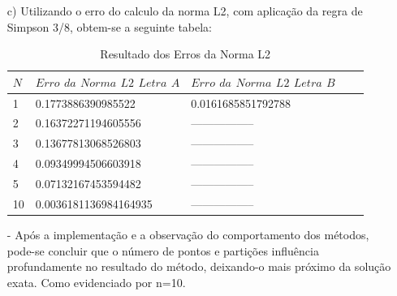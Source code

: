 \documentclass{article}
\begin{document}
\begin{itemize}
\begin{itemize}
\item[c)] Utilizando o erro do calculo da norma L2, com aplicação da regra de Simpson 3/8, obtem-se a seguinte tabela:

\begin{table}[h]
\centering
  \begin{tabular}{|l|l|l|ll}
   $N$ & $Erro$ $da$ $Norma$ $L2$ $Letra$ $A$ & $Erro$ $da$ $Norma$ $L2$ $Letra$ $B$ \\
    \hline
    1 &   0.1773886390985522 & 0.0161685851792788 \\
    2 &   0.16372271194605556 & ----------------- \\
    3 &   0.13677813068526803 & ----------------- \\
    4 &   0.09349994506603918 & ----------------- \\
    5 &   0.07132167453594482 & ----------------- \\
    10 &    0.0036181136984164935 & ----------------- \\
    \hline
  \end{tabular}
  \caption{Resultado dos Erros da Norma L2}
\end{table}

\item[-] Após a implementação e a observação do comportamento dos métodos, pode-se concluir que o número de pontos e partições influência profundamente no resultado do método, deixando-o mais próximo da solução exata. Como evidenciado por n=10.

\end{itemize}

\end{itemize}
\end{document}
